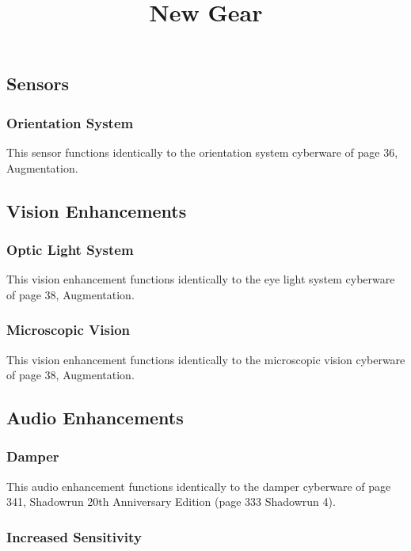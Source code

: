 \documentclass{article}
\title{New Gear}
\begin{document}
\pagestyle{empty}
\tabletail{\hline}
\tablelasttail{\hline}

\twocolumn

\subsection*{Sensors}

\subsubsection*{Orientation System}


This sensor functions identically to the orientation system cyberware of page 36, Augmentation.

\subsection*{Vision Enhancements}

\subsubsection*{Optic Light System}

This vision enhancement functions identically to the eye light system cyberware of page 38, Augmentation.

\subsubsection*{Microscopic Vision}

This vision enhancement functions identically to the microscopic vision cyberware of page 38, Augmentation.

\subsection*{Audio Enhancements}

\subsubsection*{Damper}

This audio enhancement functions identically to the damper cyberware of page 341, Shadowrun 20th Anniversary Edition (page 333 Shadowrun 4).

\subsubsection*{Increased Sensitivity}
\end{document}
